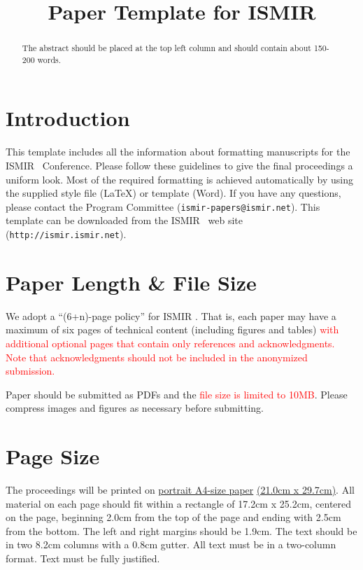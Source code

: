 \documentclass{article}
\title{Paper Template for ISMIR \conferenceyear}
\begin{document}
%
\maketitle
%
\begin{abstract}
The abstract should be placed at the top left column and should contain about 150-200 words.
\end{abstract}
%
\section{Introduction}\label{sec:introduction}

This template includes all the information about formatting manuscripts for the ISMIR \conferenceyear\ Conference.
Please follow these guidelines to give the final proceedings a uniform look.
Most of the required formatting is achieved automatically by using the supplied
style file (\LaTeX) or template (Word).
If you have any questions, please contact the Program Committee (\texttt{ismir\conferenceyear-papers@ismir.net}).
This template can be downloaded from the ISMIR \conferenceyear\ web site (\texttt{http://ismir\conferenceyear.ismir.net}).
%
\section{Paper Length \& File Size}
We adopt a ``(6+n)-page policy'' for ISMIR \conferenceyear. That is, each paper may have a maximum of six pages of technical content (including figures and tables) \textcolor{red}{with additional optional pages that contain only references and acknowledgments. Note that acknowledgments should not be included in the anonymized submission.}

Paper should be submitted as PDFs and the \textcolor{red}{file size is limited to 10MB}. Please compress images and figures as necessary before submitting.

\section{Page Size}\label{sec:page_size}

The proceedings will be printed on
 \underline{portrait A4-size paper} \underline{(21.0cm x 29.7cm)}.
All material on each page should fit within a rectangle of 17.2cm x 25.2cm,
centered on the page, beginning 2.0cm
from the top of the page and ending with 2.5cm from the bottom.
The left and right margins should be 1.9cm.
The text should be in two 8.2cm columns with a 0.8cm gutter.
All text must be in a two-column format.
Text must be fully justified.
\end{document}
